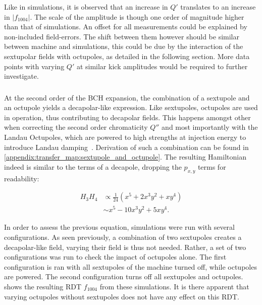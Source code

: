 Like in simulations, it is observed that an increase in $Q'$ translates to an increase in 
$|f_{1004}|$. The scale of the amplitude is though one order of magnitude higher than that of
simulations. An offset for all measurements could be explained by non-included field-errors. The
shift between them however should be similar between machine and simulations, this could be
due by the interaction of the sextupolar fields with octupoles, as detailed in the following
section. More data points with varying $Q'$ at similar kick amplitudes would be required to further
investigate.


\subsubsection{}


At the second order of the BCH expansion, the combination of a sextupole and an octupole yields a
decapolar-like expression.
Like sextupoles, octupoles are used in operation, thus contributing to decapolar fields. This
happens amongst other when correcting the second order chromaticity $Q''$ and most importantly with
the Landau Octupoles, which are powered to high strengths at injection energy to introduce Landau
damping~\cite{gareyte_landau_1997}.
Derivation of such a combination can be found in
\cref{appendix:transfer_map:sextupole_and_octupole}. The resulting Hamiltonian indeed is similar to
the terms of a decapole, dropping the $p_{x,y}$ terms for readability:

\begin{equation}
    \begin{aligned}
         H_3 H_4 &\propto \frac{1}{24} \left(x^5 + 2x^3y^2 + xy^4 \right)\\
                   &\sim    x^5 - 10x^3y^2 + 5xy^4.
    \end{aligned}
    \label{eq:decapoles:sextupole_octupole_b5}
\end{equation}

In order to assess the previous equation, simulations were run with several configurations.
As seen previously, a combination of two sextupoles creates a decapolar-like field, varying their 
field is thus not needed. Rather, a set of two configurations was run to check the impact of 
octupoles alone. The first configuration is ran with all sextupoles of the machine
turned off, while octupoles are powered. The second configuration turns off all sextupoles and
octupoles.  shows the resulting RDT $f_{1004}$
from these simulations. It is there apparent that varying octupoles without sextupoles does not have 
any effect on this RDT.

